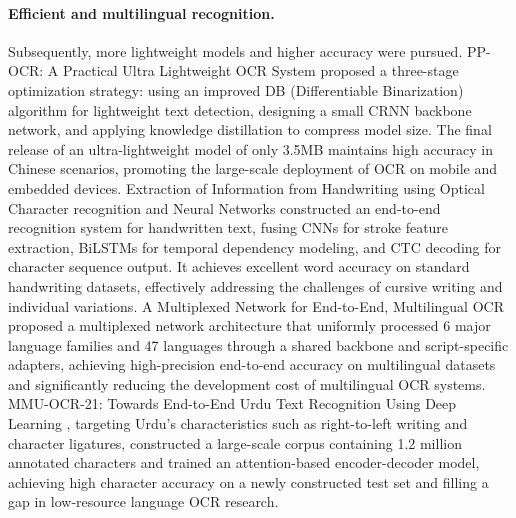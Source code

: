 \paragraph{Efficient and multilingual recognition.}
Subsequently, more lightweight models and higher accuracy were pursued. PP-OCR: A Practical Ultra Lightweight OCR System \cite{du2020ppocr} proposed a three-stage optimization strategy: using an improved DB (Differentiable Binarization) algorithm for lightweight text detection, designing a small CRNN backbone network, and applying knowledge distillation to compress model size. The final release of an ultra-lightweight model of only 3.5MB maintains high accuracy in Chinese scenarios, promoting the large-scale deployment of OCR on mobile and embedded devices. Extraction of Information from Handwriting using Optical Character recognition and Neural Networks \cite{al2019handwriting} constructed an end-to-end recognition system for handwritten text, fusing CNNs for stroke feature extraction, BiLSTMs for temporal dependency modeling, and CTC decoding for character sequence output. It achieves excellent word accuracy on standard handwriting datasets, effectively addressing the challenges of cursive writing and individual variations. A Multiplexed Network for End-to-End, Multilingual OCR \cite{pham2021multiplexed} proposed a multiplexed network architecture that uniformly processed 6 major language families and 47 languages through a shared backbone and script-specific adapters, achieving high-precision end-to-end accuracy on multilingual datasets and significantly reducing the development cost of multilingual OCR systems. MMU-OCR-21: Towards End-to-End Urdu Text Recognition Using Deep Learning \cite{ahmad2021urdu}, targeting Urdu’s characteristics such as right-to-left writing and character ligatures, constructed a large-scale corpus containing 1.2 million annotated characters and trained an attention-based encoder-decoder model, achieving high character accuracy on a newly constructed test set and filling a gap in low-resource language OCR research.


